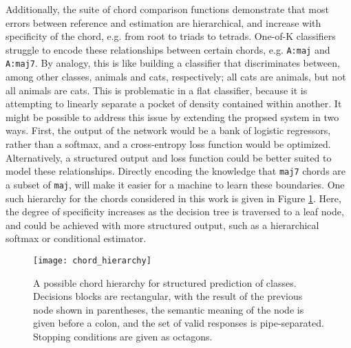 Additionally, the suite of chord comparison functions demonstrate that most errors between reference and estimation are hierarchical, and increase with specificity of the chord, e.g. from root to triads to tetrads.
One-of-K classifiers struggle to encode these relationships between certain chords, e.g. \texttt{A:maj} and \texttt{A:maj7}.
By analogy, this is like building a classifier that discriminates between, among other classes, animals and cats, respectively; all cats are animals, but not all animals are cats.
This is problematic in a flat classifier, because it is attempting to linearly separate a pocket of density contained within another.
It might be possible to address this issue by extending the propsed system in two ways.
First, the output of the network would be a bank of logistic regressors, rather than a softmax, and a cross-entropy loss function would be optimized.
Alternatively, a structured output and loss function could be better suited to model these relationships.
Directly encoding the knowledge that \texttt{maj7} chords are a subset of \texttt{maj}, will make it easier for a machine to learn these boundaries.
One such hierarchy for the chords considered in this work is given in Figure \ref{fig:chord_hierarchy}.
Here, the degree of specificity increases as the decision tree is traversed to a leaf node, and could be achieved with more structured output, such as a hierarchical softmax or conditional estimator.


\begin{figure}[t!]
\centering
\texttt{[image: chord\_hierarchy]}
\caption{A possible chord hierarchy for structured prediction of classes. Decisions blocks are rectangular, with the result of the previous node shown in parentheses, the semantic meaning of the node is given before a colon, and the set of valid responses is pipe-separated. Stopping conditions are given as octagons.}
\label{fig:chord_hierarchy}
\end{figure}



